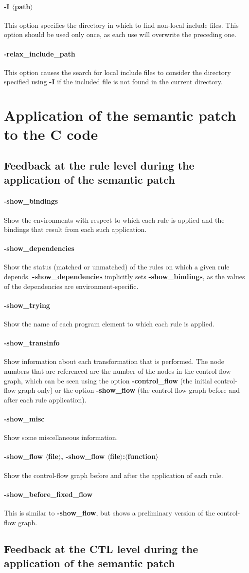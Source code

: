 \documentclass{article}
\newcommand{\normal}[2]{\paragraph*{\makebox[0in][r]{\BigLowerDiamond\,\,} {{#1}}} {#2}}
\newcommand{\rare}[2]{\paragraph*{\makebox[0in][r]{\BigDiamondshape\,\,} {{#1}}} {#2}}
\newcommand{\developer}[2]{\paragraph*{{#1}} {#2}}
\begin{document}
\normal{-I $\langle$path$\rangle$}{ This option specifies the directory in
  which to find non-local include files.  This option should be used only
  once, as each use will overwrite the preceding one.}

\rare{-relax\_include\_path}{This option causes the search for local
  include files to consider the directory specified using {\bf -I} if the
  included file is not found in the current directory.}

\section{Application of the semantic patch to the C code}

\subsection{Feedback at the rule level during the application of the
  semantic patch}

\normal{-show\_bindings}{
Show the environments with respect to which each rule is applied and the
bindings that result from each such application.}

\normal{-show\_dependencies}{ Show the status (matched or unmatched) of the
rules on which a given rule depends.  {\bf -show\_dependencies} implicitly
sets {\bf -show\_bindings}, as the values of the dependencies are
environment-specific.}

\normal{-show\_trying}{
Show the name of each program element to which each rule is applied.}

\normal{-show\_transinfo}{
Show information about each transformation that is performed.
The node numbers that are referenced are the number of the nodes in the
control-flow graph, which can be seen using the option {\bf -control\_flow}
(the initial control-flow graph only) or the option {\bf -show\_flow} (the
control-flow graph before and after each rule application).}

\normal{-show\_misc}{Show some miscellaneous information.}

\rare{-show\_flow $\langle$file$\rangle$, -show\_flow
  $\langle$file$\rangle$:$\langle$function$\rangle$} Show the control-flow
graph before and after the application of each rule.

\developer{-show\_before\_fixed\_flow}{This is similar to {\bf
    -show\_flow}, but shows a preliminary version of the control-flow graph.}

\subsection{Feedback at the CTL level during the application of the
  semantic patch}
\end{document}
